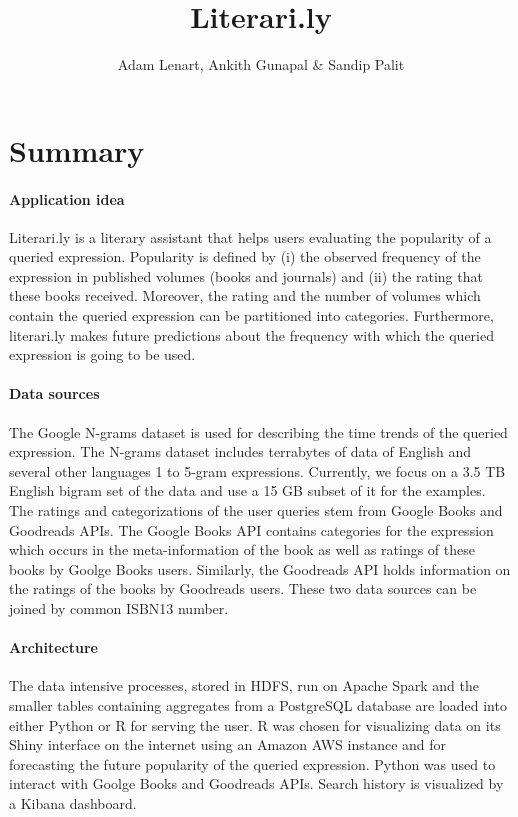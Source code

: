 \documentclass[12pt,letterpaper]{article}
\title{\Large Literari.ly}
\author{Adam Lenart, Ankith Gunapal \& Sandip Palit}
\begin{document}
\maketitle


\section{Summary}

\paragraph{Application idea} Literari.ly is a literary assistant that helps users evaluating the popularity of a queried expression. Popularity is defined by (i) the observed frequency of the expression in published volumes (books and journals) 
and (ii) the rating that these books received. Moreover, the rating and the number of volumes which contain the queried expression can be partitioned into categories. Furthermore, literari.ly makes future predictions
about the frequency with which the queried expression is going to be used.

\paragraph{Data sources} The Google N-grams dataset is used for describing the time trends of the queried expression. The N-grams dataset includes terrabytes of data of English and several other languages 1 to 5-gram expressions.
Currently, we focus on a 3.5 TB English bigram set of the data and use a 15 GB subset of it for the examples. The ratings and categorizations of the user queries stem from Google Books and Goodreads APIs. The Google Books API contains categories for the expression 
which occurs in the meta-information of the book as well as ratings of these books by Goolge Books users. Similarly, the Goodreads API holds information on the ratings of the books by Goodreads users. These two
data sources can be joined by common ISBN13 number.

\paragraph{Architecture} The data intensive processes, stored in HDFS, run on Apache Spark and the smaller tables containing aggregates from a PostgreSQL database are loaded into either Python or R for serving 
the user. R was chosen for visualizing data on its Shiny interface on the internet using an Amazon AWS instance and for forecasting the future popularity of the queried expression. Python was used to interact with Goolge Books
and Goodreads APIs. Search history is visualized by a Kibana dashboard.
\end{document}
